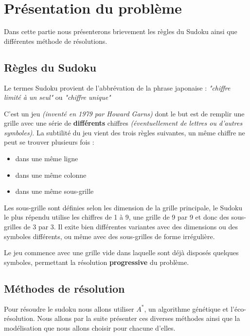 \chapter{Présentation du problème}
  
Dans cette partie nous présenterons brievement les règles du Sudoku ainsi que différentes méthode de résolutions.


\section{Règles du Sudoku}

Le termes Sudoku provient de l'abbrévation de la phrase japonaise : \textit{"chiffre limité à un seul"} ou \textit{"chiffre unique"}

C'est un jeu \textit{(inventé en 1979 par Howard Garns)} dont le but est de remplir une grille avec une série de \textbf{différents} chiffres \textit{(éventuellement de lettres ou d'autres symboles)}. La subtilité du jeu vient des trois règles suivantes, un même chiffre ne peut se trouver plusieurs fois :

\begin{itemize}

\item dans une même ligne
\item dans une même colonne
\item dans une même sous-grille

\end{itemize}

Les sous-grille sont définies selon les dimension de la grille principale, le Sudoku le plus répendu utilise les chiffres de 1 à 9, une grille de 9 par 9 et donc des sous-grilles de 3 par 3. Il exite bien différentes variantes avec des dimensions ou des symboles différents, ou même avec des sous-grilles de forme irrégulière.

Le jeu commence avec une grille vide dans laquelle sont déjà disposés quelques symboles, permettant la résolution \textbf{progressive} du problème.


\section{Méthodes de résolution}

Pour résoudre le sudoku nous allons utiliser $A^*$, un algorithme génétique et l'éco-résolution. Nous allons par la suite présenter ces diverses méthodes ainsi que la modélisation que nous allons choisir pour chacune d'elles. 

